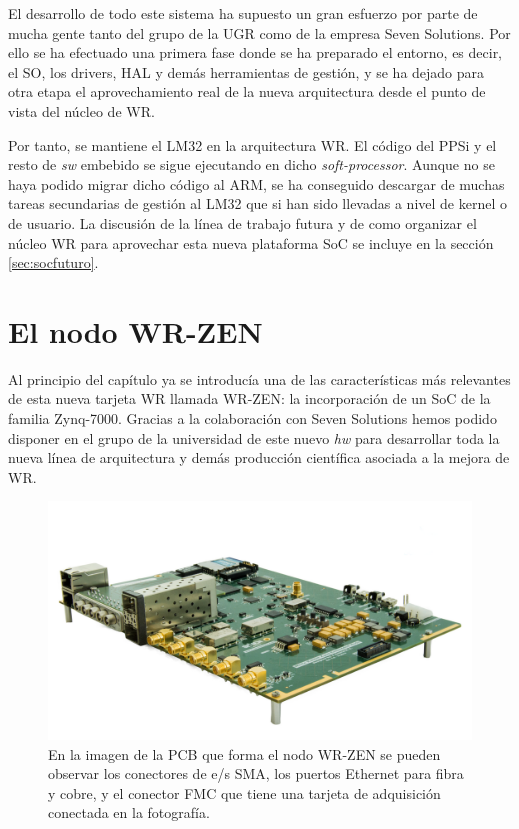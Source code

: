 El desarrollo de todo este sistema ha supuesto un gran esfuerzo por parte de 
mucha gente tanto del grupo de la UGR como de la empresa Seven Solutions. Por 
ello se ha efectuado una primera fase donde se ha preparado el entorno, es 
decir, el SO, los drivers, HAL y demás herramientas de gestión, y se ha dejado 
para otra etapa el aprovechamiento real de la nueva arquitectura desde el punto 
de vista del núcleo de WR.

Por tanto, se mantiene el LM32 en la arquitectura WR. El código del PPSi y el 
resto de \textit{sw} embebido se sigue ejecutando en dicho 
\textit{soft-processor}. Aunque no se haya podido migrar dicho código al ARM, 
se ha conseguido descargar de muchas tareas secundarias de gestión al LM32 que 
si han sido llevadas a nivel de kernel o de usuario. La discusión de la línea 
de trabajo futura y de como organizar el núcleo WR para aprovechar esta nueva 
plataforma SoC se incluye en la sección \ref{sec:socfuturo}.

\section{El nodo WR-ZEN}

Al principio del capítulo ya se introducía una de las características más 
relevantes de esta nueva tarjeta WR llamada WR-ZEN: la incorporación de un SoC 
de la familia Zynq-7000. Gracias a la colaboración con Seven Solutions hemos 
podido disponer en el grupo de la universidad de este nuevo \textit{hw} para 
desarrollar toda la nueva línea de arquitectura y demás producción científica 
asociada a la mejora de WR.

\begin{figure}
	\centering
	\includegraphics[width=0.7\linewidth]{imagenes/wrzen}
	\caption[Foto de la tarjeta WR-ZEN]{En la imagen de la PCB que forma el 
	nodo WR-ZEN se pueden observar los conectores de e/s SMA, los puertos 
	Ethernet para fibra y cobre, y el conector FMC que tiene una tarjeta de 
	adquisición conectada en la fotografía.}
	\label{fig:wrzen}
\end{figure}

